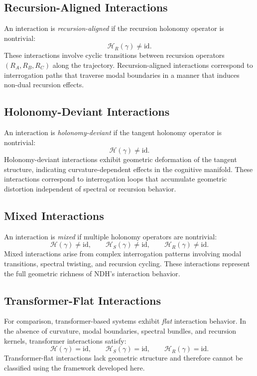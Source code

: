 \subsection{Recursion-Aligned Interactions}

An interaction is \emph{recursion-aligned} if the recursion holonomy operator is
nontrivial:
\[
\mathcal{H}_R(\gamma) \neq \mathrm{id}.
\]
These interactions involve cyclic transitions between recursion operators
$(R_A, R_B, R_C)$ along the trajectory. Recursion-aligned interactions correspond
to interrogation paths that traverse modal boundaries in a manner that induces
non-dual recursion effects.

\subsection{Holonomy-Deviant Interactions}

An interaction is \emph{holonomy-deviant} if the tangent holonomy operator is
nontrivial:
\[
\mathcal{H}(\gamma) \neq \mathrm{id}.
\]
Holonomy-deviant interactions exhibit geometric deformation of the tangent
structure, indicating curvature-dependent effects in the cognitive manifold.
These interactions correspond to interrogation loops that accumulate geometric
distortion independent of spectral or recursion behavior.

\subsection{Mixed Interactions}

An interaction is \emph{mixed} if multiple holonomy operators are nontrivial:
\[
\mathcal{H}(\gamma) \neq \mathrm{id}, \qquad
\mathcal{H}_S(\gamma) \neq \mathrm{id}, \qquad
\mathcal{H}_R(\gamma) \neq \mathrm{id}.
\]
Mixed interactions arise from complex interrogation patterns involving modal
transitions, spectral twisting, and recursion cycling. These interactions
represent the full geometric richness of NDH's interaction behavior.

\subsection{Transformer-Flat Interactions}

For comparison, transformer-based systems exhibit \emph{flat} interaction
behavior. In the absence of curvature, modal boundaries, spectral bundles, and
recursion kernels, transformer interactions satisfy:
\[
\mathcal{H}(\gamma) = \mathrm{id}, \qquad
\mathcal{H}_S(\gamma) = \mathrm{id}, \qquad
\mathcal{H}_R(\gamma) = \mathrm{id}.
\]
Transformer-flat interactions lack geometric structure and therefore cannot be
classified using the framework developed here.

